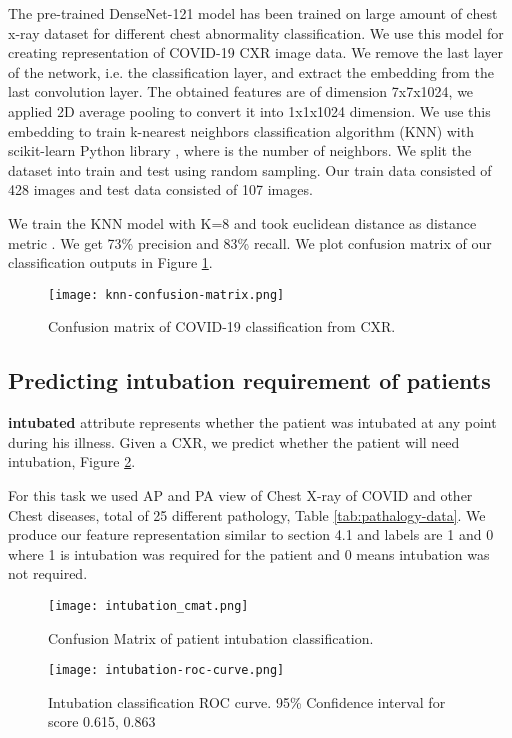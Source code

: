 \documentclass[a4paper]{article}
\begin{document}
The pre-trained DenseNet-121 model has been trained on large amount of chest x-ray dataset for different chest abnormality classification. We use this model for creating representation of COVID-19 CXR image data. We remove the last layer of the network, i.e. the classification layer, and extract the embedding from the last convolution layer. The obtained features are of dimension 7x7x1024, we applied 2D average pooling to convert it into 1x1x1024 dimension.
We use this embedding to train k-nearest neighbors classification algorithm (KNN) with scikit-learn Python library \cite{scikit-learn}, where  is the number of neighbors. We split the dataset into train and test using random sampling. Our train data consisted of 428 images and test data consisted of 107 images.

We train the KNN model with K=8 and took euclidean distance as distance metric .
We get 73\% precision and 83\% recall. We plot confusion matrix of our classification outputs in Figure \ref{fig:knn-cmat}.


\begin{figure}[h]
\centering
\texttt{[image: knn-confusion-matrix.png]}
\caption{\label{fig:knn-cmat}Confusion matrix of COVID-19 classification from CXR.}
\end{figure}


\subsection{Predicting intubation requirement of patients}

\cite{cohen2020covid} \textbf{intubated} attribute represents whether the patient was intubated at any point during his illness. Given a CXR, we predict whether the patient will need intubation, Figure \ref{fig:intub-cmat}.

For this task we used AP and PA view of Chest X-ray of COVID and other Chest diseases, total of 25 different pathology, Table \ref{tab:pathalogy-data}.
We produce our feature representation similar to section 4.1 and labels are 1 and 0 where 1 is intubation was required for the patient and 0 means intubation was not required.

\begin{figure}[h]
\centering
\texttt{[image: intubation\_cmat.png]}
\caption{\label{fig:intub-cmat}Confusion Matrix of patient intubation classification.}
\end{figure}

\begin{figure}[h]
\centering
\texttt{[image: intubation-roc-curve.png]}
\caption{\label{fig:intubation-auc-curve}Intubation classification ROC curve. 95\% Confidence interval for score 0.615, 0.863}
\end{figure}
\end{document}

